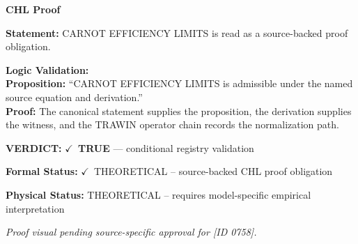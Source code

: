 \vspace{0.45em}
\noindent\textbf{CHL Proof}\par
\textbf{Statement:} CARNOT EFFICIENCY LIMITS is read as a source-backed proof obligation.

\textbf{Logic Validation:}\\
\textbf{Proposition:} ``CARNOT EFFICIENCY LIMITS is admissible under the named source equation and derivation.''\\
\textbf{Proof:} The canonical statement supplies the proposition, the derivation supplies the witness, and the TRAWIN operator chain records the normalization path.

\textbf{VERDICT:} \ensuremath{\checkmark}\ \textbf{TRUE} --- conditional registry validation

\textbf{Formal Status:} \ensuremath{\checkmark}\ THEORETICAL -- source-backed CHL proof obligation

\textbf{Physical Status:} THEORETICAL -- requires model-specific empirical interpretation
\par\vspace{0.45em}
\par
\vfill
\begingroup\footnotesize\itshape
Proof visual pending source-specific approval for [ID 0758].
\par\endgroup
\vfill
\endgroup
\endgroup
